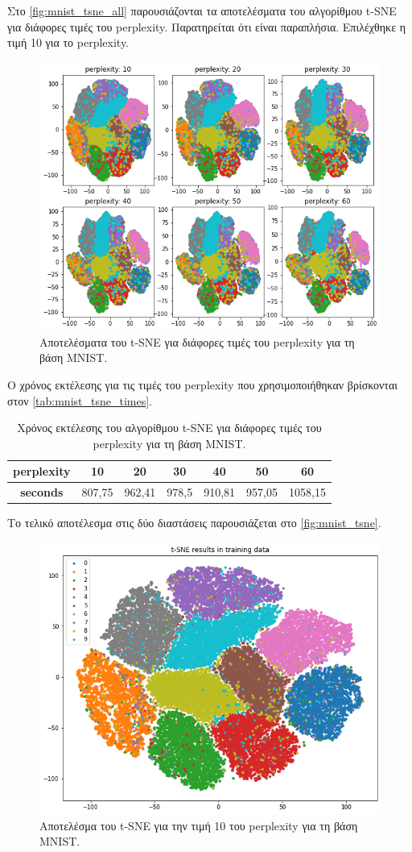 \documentclass[a4paper]{article}
\begin{document}
Στο \autoref{fig:mnist_tsne_all} παρουσιάζονται τα αποτελέσματα του αλγορίθμου
t-SNE για διάφορες τιμές του perplexity. Παρατηρείται ότι είναι παραπλήσια.
Επιλέχθηκε η τιμή 10 για το perplexity.

\begin{figure}[H]
    \centering
    \includegraphics[width=0.6\linewidth]{mnist/tsne_all.png}
    \caption{Αποτελέσματα του t-SNE για διάφορες τιμές του perplexity για τη
    βάση MNIST.}
    \label{fig:mnist_tsne_all}
\end{figure}

Ο χρόνος εκτέλεσης για τις τιμές του perplexity που χρησιμοποιήθηκαν βρίσκονται
στον \autoref{tab:mnist_tsne_times}.

\begin{table}[H]
\centering
\begin{tabular}{|c|c|c|c|c|c|c|}
\hline
\textbf{perplexity} & \textbf{10} & \textbf{20} & \textbf{30} & \textbf{40} & \textbf{50} & \textbf{60} \\ \hline
\textbf{seconds}    & 807,75      & 962,41      & 978,5       & 910,81      & 957,05      & 1058,15     \\ \hline
\end{tabular}
\caption{Χρόνος εκτέλεσης του αλγορίθμου t-SNE για διάφορες τιμές του perplexity
    για τη βάση MNIST.}
\label{tab:mnist_tsne_times}
\end{table}

Το τελικό αποτέλεσμα στις δύο διαστάσεις παρουσιάζεται στο
\autoref{fig:mnist_tsne}.

\begin{figure}[H]
    \centering
    \includegraphics[width=0.6\linewidth]{mnist/tsne_training.png}
    \caption{Αποτελέσμα του t-SNE για την τιμή 10 του perplexity για τη βάση
    MNIST.}
    \label{fig:mnist_tsne}
\end{figure}
\end{document}
